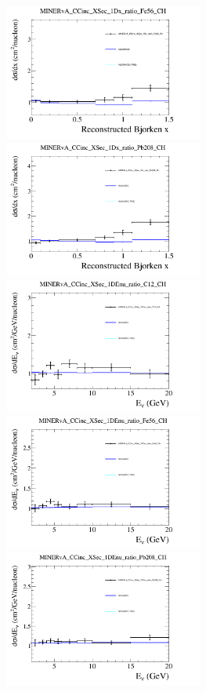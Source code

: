 \documentclass{article}
\begin{document}
\\\centering
\includegraphics[width=0.49\textwidth]{figures/nuisance_MINERvA_CCinc_XSec_1Dx_ratio_Fe56_CH_comp.png}
\\\centering
\includegraphics[width=0.49\textwidth]{figures/nuisance_MINERvA_CCinc_XSec_1Dx_ratio_Pb208_CH_comp.png}
\\\centering
\includegraphics[width=0.49\textwidth]{figures/nuisance_MINERvA_CCinc_XSec_1DEnu_ratio_C12_CH_comp.png}
\\\centering
\includegraphics[width=0.49\textwidth]{figures/nuisance_MINERvA_CCinc_XSec_1DEnu_ratio_Fe56_CH_comp.png}
\\\centering
\includegraphics[width=0.49\textwidth]{figures/nuisance_MINERvA_CCinc_XSec_1DEnu_ratio_Pb208_CH_comp.png}
\\
\end{document}
